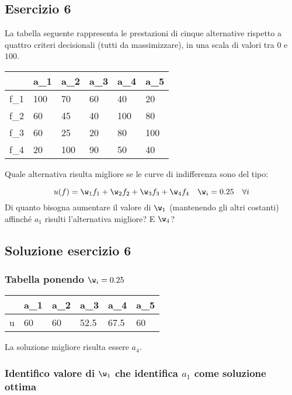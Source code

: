 \documentclass[\main/main.tex]{subfiles}
\begin{document}
\subsection{Esercizio 6}
La tabella seguente rappresenta le prestazioni di cinque alternative rispetto a quattro criteri decisionali (tutti da massimizzare), in una scala di valori tra $0$ e $100$.

\begin{table}
  \begin{tabular}{L|LLLLL}
        & a_1 & a_2 & a_3 & a_4 & a_5 \\
    \hline
    f_1 & 100 & 70  & 60  & 40  & 20  \\
    f_2 & 60  & 45  & 40  & 100 & 80  \\
    f_3 & 60  & 25  & 20  & 80  & 100 \\
    f_4 & 20  & 100 & 90  & 50  & 40
  \end{tabular}
\end{table}

Quale alternativa risulta migliore se le curve di indifferenza sono del tipo:

\[
  u(f) = \w_1f_1 + \w_2f_2 + \w_3f_3 + \w_4f_4 \quad \w_i = 0.25 \quad \forall i
\]
Di quanto bisogna aumentare il valore di $\w_1$ (mantenendo gli altri costanti) affinché $a_1$ risulti l'alternativa migliore? E $\w_4$?

\subsection{Soluzione esercizio 6}

\subsubsection*{Tabella ponendo $\w_i=0.25$}

\begin{table}
  \begin{tabular}{L|LLLLL}
      & a_1 & a_2 & a_3  & a_4  & a_5 \\
    \hline
    u & 60  & 60  & 52.5 & 67.5 & 60  \\
  \end{tabular}
\end{table}

La soluzione migliore risulta essere $a_4$.

\subsubsection*{Identifico valore di $\w_1$ che identifica $a_1$ come soluzione ottima}
\end{document}

